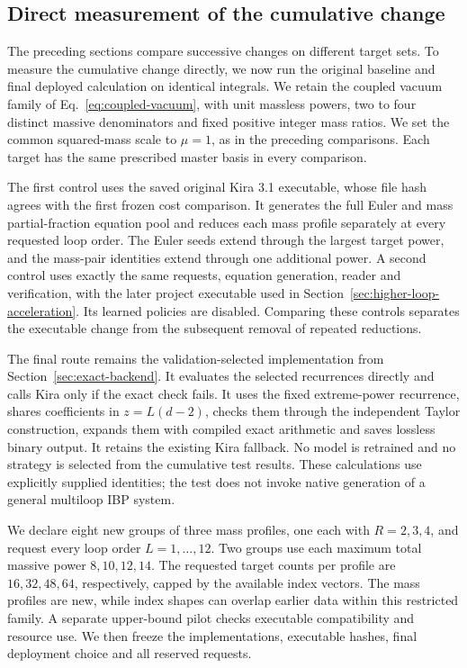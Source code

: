 \clearpage
\subsection{Direct measurement of the cumulative change}
\label{sec:cumulative-speedup}
The preceding sections compare successive changes on different target sets.
To measure the cumulative change directly, we now run the original baseline
and final deployed calculation on identical integrals. We retain the
coupled vacuum family of Eq.~\eqref{eq:coupled-vacuum}, with unit massless
powers, two to four distinct massive denominators and fixed positive
integer mass ratios. We set the common squared-mass scale to \(\mu=1\),
as in the preceding comparisons. Each target has the same prescribed master basis
in every comparison.

The first control uses the saved original Kira 3.1 executable, whose file
hash agrees with the first frozen cost comparison. It generates the full
Euler and mass partial-fraction equation pool and reduces each mass
profile separately at every requested loop order. The Euler seeds extend
through the largest target power, and the mass-pair identities extend
through one additional power. A second control uses exactly the same
requests, equation generation, reader and verification, with the later
project executable used in Section~\ref{sec:higher-loop-acceleration}.
Its learned policies are disabled. Comparing these controls separates
the executable change from the subsequent removal of repeated reductions.

The final route remains the validation-selected implementation from
Section~\ref{sec:exact-backend}. It evaluates the selected recurrences directly and calls Kira only if
the exact check fails. It uses the fixed extreme-power recurrence,
shares coefficients in \(z=L(d-2)\), checks them through the independent
Taylor construction, expands them with compiled exact arithmetic and
saves lossless binary output. It retains the existing Kira fallback.
No model is retrained and no strategy is selected from the cumulative
test results. These calculations use explicitly supplied identities;
the test does not invoke native generation of a general multiloop IBP
system.

We declare eight new groups of three mass profiles, one each with
\(R=2,3,4\), and request every loop order \(L=1,\ldots,12\).
Two groups use each maximum total massive power \(8,10,12,14\).
The requested target counts per profile are \(16,32,48,64\), respectively,
capped by the available index vectors. The mass profiles are new, while
index shapes can overlap earlier data within this restricted family.
A separate upper-bound pilot checks executable compatibility and
resource use. We then freeze the implementations, executable hashes,
final deployment choice and all reserved requests.

